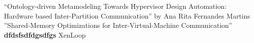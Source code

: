 “Ontology-driven Metamodeling Towards Hypervisor Design Automation: Hardware based Inter-Partition Communication” by Ana Rita Fernandes Martins\\
\indent ”Shared-Memory Optimizations for Inter-Virtual-Machine Communication”\\
\textbf{dfdsfsdfdgsdfgs}
\indent XenLoop \cite{Nastide2010}\\
